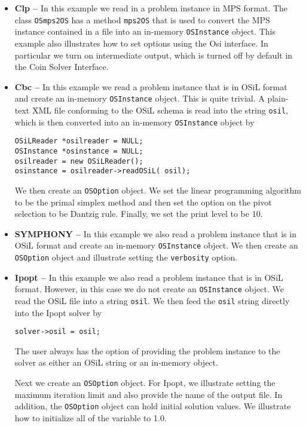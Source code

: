 \begin{itemize}
\item {\bf Clp --}  In this example we read in a problem instance in MPS format.  The class 
{\tt OSmps2OS}  has a method {\tt mps2OS} that is used to convert the MPS instance contained 
in a file into an in-memory {\tt OSInstance} object. This example also illustrates how to 
set options using the Osi interface. In particular we turn on intermediate output, which is 
turned off by default in the Coin Solver Interface. 

\item {\bf Cbc --}  In this example we read a problem instance that is in OSiL format and create 
an in-memory {\tt OSInstance} object.  This is quite trivial.  
A  plain-text XML file conforming to the OSiL schema is read into the string {\tt osil}, 
which is then  converted into an in-memory {\tt OSInstance} object by

\begin{verbatim}
OSiLReader *osilreader = NULL;
OSInstance *osinstance = NULL;
osilreader = new OSiLReader(); 
osinstance = osilreader->readOSiL( osil);
\end{verbatim}


We then create an {\tt OSOption} object.   We set the linear programming algorithm to be the primal simplex method and then set the option 
on the pivot selection to be Dantzig rule.  Finally, we set the print level to be 10.

\item {\bf SYMPHONY --}   In this example we also read a problem instance that is in OSiL format and 
create an in-memory {\tt OSInstance} object.  We then create an {\tt OSOption} object and 
illustrate setting the {\tt verbosity} option.

\item {\bf Ipopt --}   In this example we also read a problem instance that is in OSiL format.  
However, in this case we do  not create an {\tt OSInstance} object. We read the OSiL file into 
a string {\tt osil}.  We then feed the {\tt osil} string directly into the Ipopt solver by
\begin{verbatim}
solver->osil = osil;
\end{verbatim} 
The user always has the option of providing the problem instance to the solver 
as either an OSiL string or an in-memory object.

Next we create an {\tt OSOption} object. For Ipopt, we illustrate setting the maximum iteration limit 
and also provide the name of the output file. 
In addition, the {\tt OSOption} object can hold initial solution 
values. We illustrate how to initialize all of the variable to 1.0.


\end{itemize}
